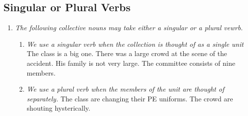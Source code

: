 \subsection{Singular or Plural Verbs}
\begin{enumerate}
    \item
        {\it
        The following collective nouns may take either a singular or a plural
        vewrb.
        }
        \newline
        \newline
        {\centering
        }
        \newline
        \newline
        \begin{enumerate}
            \item
                {\it
                We use a singular verb when the collection is thought of as a
                single unit
                }
                \newline
                \newline
                The class is a big one.
                \newline
                \newline
                There was a large crowd at the scene of the accident.
                \newline
                \newline
                His family is not very large.
                \newline
                \newline
                The committee consists of nine members.
            \item
                {\it
                We use a plural verb when the members of the unit are thought of
                separately.
                }
                \newline
                \newline
                The class are changing their PE uniforms.
                \newline
                \newline
                The crowd are shouting hysterically.

\end{enumerate}
\end{enumerate}
